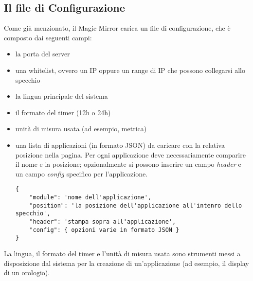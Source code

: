 \subsection{Il file di Configurazione}
Come gi\`a menzionato, il Magic Mirror carica un file di configurazione, che è composto dai seguenti campi:
\begin{itemize}
\item la porta del server
\item una whitelist, ovvero un IP oppure un range di IP che possono collegarsi allo specchio
\item la lingua principale del sistema
\item il formato del timer (12h o 24h)
\item unit\`a di misura usata (ad esempio, metrica)
\item una lista di applicazioni (in formato JSON) da caricare con la relativa posizione nella pagina. Per ogni applicazione deve necessariamente comparire il
nome e la posizione; opzionalmente si possono inserire un campo  \textit{header} e un campo \textit{config} specifico per l'applicazione.
\begin{lstlisting}
{
	"module": 'nome dell'applicazione',
	"position": 'la posizione dell'applicazione all'intenro dello specchio',
	"header": 'stampa sopra all'applicazione',
	"config": { opzioni varie in formato JSON }
}
\end{lstlisting}
\end{itemize}
La lingua, il formato del timer e l'unit\`a di misura usata sono strumenti messi a disposizione dal sistema per la creazione di un'applicazione
(ad esempio, il display di un orologio).

